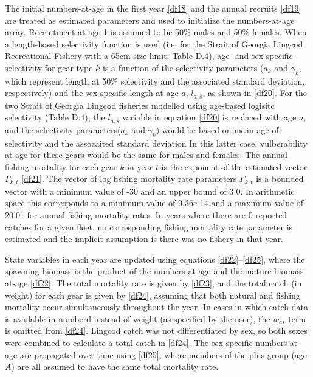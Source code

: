 \documentclass[11pt]{article}   %
\def\AppLet{D}                   %
\begin{document}
The initial numbers-at-age in the first year \eqref{df18} and the annual recruits \eqref{df19} are treated as estimated parameters and used to initialize the numbers-at-age array.  Recruitment at age-1 is assumed to be 50\% males and 50\% females.  When a length-based selectivity function is used (i.e. for the Strait of Georgia Lingcod Recreational Fishery with a 65cm size limit; Table \AppLet.4), age- and sex-specific selectivity for gear type $k$ is a function of the selectivity parameters ($a_k$ and $\gamma_k$, which represent length at 50\% selectivity and the associated standard deviation, respectively) and the sex-specific length-at-age $a$, $l_{a,s}$, as shown in \eqref{df20}.  For the two Strait of Georgia Lingcod fisheries modelled using age-based logisitc selectivity (Table \AppLet.4), the $l_{a,s}$ variable in equation \eqref{df20} is replaced with age $a$, and the selectivity parameters($a_k$ and $\gamma_k$) would be based on mean age of selectivity and the assocaited standard deviation  In this latter case, vulberability at age for these gears would be the same for males and females.  The annual fishing mortality for each gear $k$ in year $t$ is the exponent of the estimated vector $\Gamma_{k,t}$ \eqref{df21}.  The vector of log fishing mortality rate parameters $\Gamma_{k,t}$ is a bounded vector with a minimum value of -30 and an upper bound of 3.0.  In arithmetic space this corresponds to a minimum value of 9.36e-14 and a maximum value of 20.01 for annual fishing mortality rates.  In years where there are 0 reported catches for a given fleet, no corresponding fishing mortality rate parameter is estimated and the implicit assumption is there was no fishery in that year.

State variables in each year are updated using equations \ref{df22}--\ref{df25}, where the spawning biomass is the product of the numbers-at-age and the mature biomass-at-age \eqref{df22}.  The total mortality rate is given by \eqref{df23}, and the total catch (in weight) for each gear is given by \eqref{df24}, assuming that both natural and fishing mortality occur simultaneously throughout the year.  In cases in which catch data is available in numberd instead of weight (as specified by the user), the $w_{as}$ term is omitted from \eqref{df24}.  Lingcod catch was not differentiated by sex, so both sexes were combined to calculate a total catch in \eqref{df24}.  The sex-specific numbers-at-age are propagated over time using \eqref{df25}, where members of the plus group (age $A$) are all assumed to have the same total mortality rate.  
\end{document}

